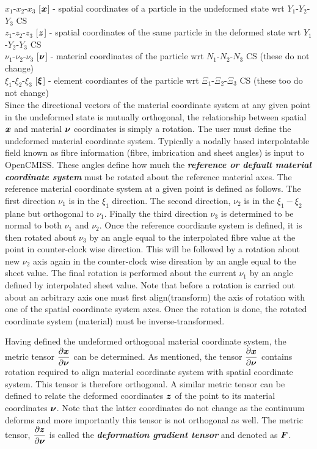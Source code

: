 \noindent $x_{1}$-$x_{2}$-$x_{3}$ [$\vect{x}$] - spatial coordinates of a particle in the undeformed state wrt $Y_{1}$-$Y_{2}$-$Y_{3}$ CS \\
$z_{1}$-$z_{2}$-$z_{3}$ [$\vect{z}$] - spatial coordinates of the same particle in the deformed state wrt $Y_{1}$-$Y_{2}$-$Y_{3}$ CS \\ 
$\nu_{1}$-$\nu_{2}$-$\nu_{3}$ [$\vect{\nu}$] - material coordinates of the particle wrt $N_{1}$-$N_{2}$-$N_{3}$ CS (these do not change) \\
$\xi_{1}$-$\xi_{2}$-$\xi_{3}$ [$\vect{\xi}$] - element coordiantes of the particle wrt $\Xi_{1}$-$\Xi_{2}$-$\Xi_{3}$ CS (these too do not change)\\

Since the directional vectors of the material coordinate system at any given point in the undeformed state is mutually orthogonal, the 
relationship between spatial $\vect{x}$ and material $\vect{\nu}$ coordinates is simply a rotation. The user must define the undeformed 
material coordinate system. Typically a nodally based interpolatable field known as fibre information (fibre, imbrication and sheet angles) 
is input to OpenCMISS. These angles define how much the \textit{\textbf{reference or default material coordinate system}} must be rotated about 
the reference material axes. The reference material coordinate system at a given point is defined as follows. The first direction $\nu_{1}$ is 
in the $\xi_{1}$ direction. The second direction, $\nu_{2}$ is in the $\xi_{1}-\xi_{2}$ plane but orthogonal to $\nu_{1}$. Finally the third 
direction $\nu_{3}$ is determined to be normal to both $\nu_{1}$ and $\nu_{2}$. Once the reference coordiante system is defined, it is then rotated 
about $\nu_{3}$ by an angle equal to the interpolated fibre value at the point in counter-clock wise direction. This will be followed by a rotation 
about new $\nu_{2}$ axis again in the counter-clock wise direation by an angle equal to the sheet value. The final rotation is performed about the 
current $\nu_{1}$ by an angle defined by interpolated sheet value. Note that before a rotation is carried out about an arbitrary axis one must first 
align(transform) the axis of rotation with one of the spatial coordinate system axes. Once the rotation is done, the rotated coordinate 
system (material) must be inverse-transformed. 

Having defined the undeformed orthogonal material coordinate system, the metric tensor $\delby{\vect{x}}{\vect{\nu}}$ can be determined. As mentioned,
the tensor $\delby{\vect{x}}{\vect{\nu}}$ contains rotation required to align material coordinate system with spatial coordinate system. This tensor
is therefore orthogonal. A similar metric tensor can be defined to relate the deformed coordinates $\vect{z}$ of the point to its material
coordinates $\vect{\nu}$. Note that the latter coordinates do not change as the continuum deforms and more importantly this tensor is not 
orthogonal as well. The metric tensor, $\delby{\vect{z}}{\vect{\nu}}$ is called the \textit{\textbf{deformation gradient tensor}} and denoted 
as $\matr{F}$.


